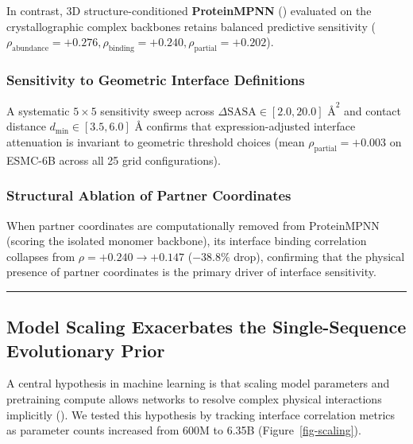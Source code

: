 \documentclass[
  11pt,
  us-letterpaper,
  DIV=11,
  numbers=noendperiod]{scrartcl}
\begin{document}
In contrast, 3D structure-conditioned \textbf{ProteinMPNN}
() evaluated on
the crystallographic complex backbones retains balanced predictive
sensitivity
(\(\rho_{\text{abundance}} = +0.276, \rho_{\text{binding}} = +0.240, \rho_{\text{partial}} = \mathbf{+0.202}\)).

\subsubsection{Sensitivity to Geometric Interface
Definitions}\label{sensitivity-to-geometric-interface-definitions}

A systematic \(5 \times 5\) sensitivity sweep across
\(\Delta\text{SASA} \in [2.0, 20.0]\text{ \AA}^2\) and contact distance
\(d_{\text{min}} \in [3.5, 6.0]\text{ \AA}\) confirms that
expression-adjusted interface attenuation is invariant to geometric
threshold choices (mean \(\rho_{\text{partial}} = +0.003\) on ESMC-6B
across all 25 grid configurations).

\subsubsection{Structural Ablation of Partner
Coordinates}\label{structural-ablation-of-partner-coordinates}

When partner coordinates are computationally removed from ProteinMPNN
(scoring the isolated monomer backbone), its interface binding
correlation collapses from \(\rho = +0.240 \to +0.147\) (\(-38.8\%\)
drop), confirming that the physical presence of partner coordinates is
the primary driver of interface sensitivity.

\begin{center}\rule{0.5\linewidth}{0.5pt}\end{center}

\subsection{Model Scaling Exacerbates the Single-Sequence Evolutionary
Prior}\label{model-scaling-exacerbates-the-single-sequence-evolutionary-prior}

A central hypothesis in machine learning is that scaling model
parameters and pretraining compute allows networks to resolve complex
physical interactions implicitly (). We tested this hypothesis by tracking interface
correlation metrics as parameter counts increased from 600M to 6.35B
(Figure~\ref{fig-scaling}).
\end{document}
